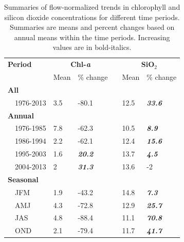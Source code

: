 \documentclass[letterpaper,12pt,oneside]{article}\usepackage[]{graphicx}\usepackage[]{color}
\begin{document}
\begin{table}[!tbp]
\caption{Summaries of flow-normalized trends in chlorophyll and silicon dioxide concentrations for different time periods. Summaries are means and percent changes based on annual means within the time periods.  Increasing values are in bold-italics.\label{tab:chlsio}} 
\begin{center}
\begin{tabular}{lllcll}
\hline\hline
\multicolumn{1}{l}{\bfseries Period}&\multicolumn{2}{c}{\bfseries Chl-\textit{a}}&\multicolumn{1}{c}{\bfseries }&\multicolumn{2}{c}{\bfseries SiO$_2$}\tabularnewline
\cline{2-3} \cline{5-6}
\multicolumn{1}{l}{}&\multicolumn{1}{c}{Mean}&\multicolumn{1}{c}{\% change}&\multicolumn{1}{c}{}&\multicolumn{1}{c}{Mean}&\multicolumn{1}{c}{\% change}\tabularnewline
\hline
{\bfseries All}&&&&&\tabularnewline
~~1976-2013&3.5&-80.1&&12.5&\textit{\textbf{33.6}}\tabularnewline
\hline
{\bfseries Annual}&&&&&\tabularnewline
~~1976-1985&7.8&-62.3&&10.5&\textit{\textbf{8.9}}\tabularnewline
~~1986-1994&2.2&-62.1&&12.4&\textit{\textbf{15.6}}\tabularnewline
~~1995-2003&1.6&\textit{\textbf{20.2}}&&13.7&\textit{\textbf{4.5}}\tabularnewline
~~2004-2013&2&\textit{\textbf{31.3}}&&13.6&-2\tabularnewline
\hline
{\bfseries Seasonal}&&&&&\tabularnewline
~~JFM&1.9&-43.2&&14.8&\textit{\textbf{7.3}}\tabularnewline
~~AMJ&4.3&-72.8&&12.9&\textit{\textbf{25.7}}\tabularnewline
~~JAS&4.8&-88.4&&11.1&\textit{\textbf{70.8}}\tabularnewline
~~OND&2.1&-79.4&&11.7&\textit{\textbf{41.7}}\tabularnewline
\hline
\end{tabular}\end{center}

\end{table}
\end{document}

